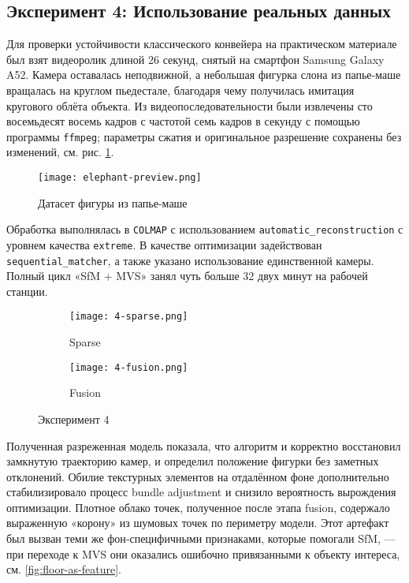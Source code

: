 \subsection{Эксперимент 4: Использование реальных данных}

Для проверки устойчивости классического конвейера на практическом материале был
взят видеоролик длиной 26 секунд, снятый на смартфон Samsung Galaxy A52.
Камера оставалась неподвижной, а небольшая фигурка слона из папье‑маше вращалась
на круглом пьедестале, благодаря чему получилась имитация кругового облёта
объекта. Из видеопоследовательности были извлечены сто восемьдесят восемь кадров
с частотой семь кадров в секунду с помощью программы \texttt{ffmpeg}; параметры
сжатия и оригинальное разрешение сохранены без изменений, см. рис. \ref{fig:elephant-preview}.

\begin{figure}[h]
  \centering
  \texttt{[image: elephant-preview.png]}
  \caption{Датасет фигуры из папье-маше}
	\label{fig:elephant-preview}
\end{figure}

Обработка выполнялась в \texttt{COLMAP} с использованием
\texttt{automatic\_reconstruction} с уровнем качества \texttt{extreme}. В
качестве оптимизации задействован \texttt{sequential\_matcher}, а также
указано использование единственной камеры. Полный
цикл «SfM + MVS» занял чуть больше 32 двух минут на рабочей станции.

\begin{figure}[h]
    \centering
    \begin{subfigure}[b]{0.3\textwidth}
        \texttt{[image: 4-sparse.png]}
        \caption{Sparse}
        \label{fig:4sparse}
    \end{subfigure}
    \begin{subfigure}[b]{0.3\textwidth}
        \texttt{[image: 4-fusion.png]}
        \caption{Fusion}
        \label{fig:4fusion}
    \end{subfigure}
    \caption{Эксперимент 4}
    \label{fig:4exp}
\end{figure}

Полученная разреженная модель показала, что алгоритм и корректно восстановил
замкнутую траекторию камер, и определил положение фигурки без заметных
отклонений. Обилие текстурных элементов на отдалённом фоне дополнительно
стабилизировало процесс bundle adjustment и снизило вероятность вырождения
оптимизации. Плотное облако точек, полученное после этапа fusion, содержало
выраженную «корону» из шумовых точек по периметру модели. Этот артефакт был
вызван теми же фон‑специфичными признаками, которые помогали SfM, — при переходе
к MVS они оказались ошибочно привязанными к объекту интереса, см. \ref{fig:floor-as-feature}.

